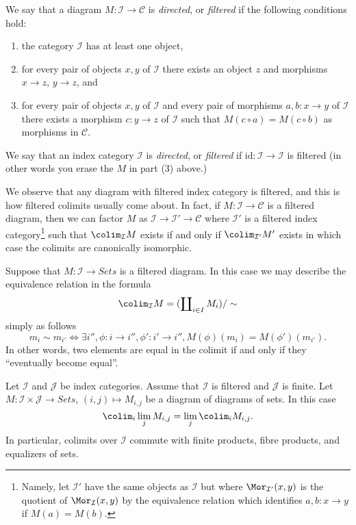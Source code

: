 \begin{definition}
\label{definition-directed}
We say that a diagram $M : \mathcal{I} \to \mathcal{C}$ is {\it directed},
or {\it filtered} if the following conditions hold:
\begin{enumerate}
\item the category $\mathcal{I}$ has at least one object,
\item for every pair of objects $x, y$ of $\mathcal{I}$
there exists an object $z$ and morphisms $x \to z$,
$y \to z$, and
\item for every pair of objects $x, y$ of $\mathcal{I}$
and every pair of morphisms $a, b : x \to y$ of $\mathcal{I}$
there exists a morphism $c : y \to z$ of $\mathcal{I}$
such that $M(c \circ a) = M(c \circ b)$ as morphisms in $\mathcal{C}$.
\end{enumerate}
We say that an index category $\mathcal{I}$ is {\it directed}, or
{\it filtered} if $\text{id} : \mathcal{I} \to \mathcal{I}$ is filtered
(in other words you erase the $M$ in part (3) above.)
\end{definition}

\noindent
We observe that any diagram with filtered index category is filtered,
and this is how filtered colimits usually come about. In fact, if
$M : \mathcal{I} \to \mathcal{C}$ is a filtered diagram, then we
can factor $M$ as $\mathcal{I} \to \mathcal{I}' \to \mathcal{C}$
where $\mathcal{I}'$ is a filtered index category\footnote{Namely, let
$\mathcal{I}'$ have the same objects as $\mathcal{I}$ but
where $\Mor_{\mathcal{I}'}(x, y)$ is the quotient of $\Mor_\mathcal{I}(x, y)$
by the equivalence relation which identifies
$a, b : x \to y$ if $M(a) = M(b)$.}
such that $\colim_\mathcal{I} M$ exists if and only if
$\colim_{\mathcal{I}'} M'$ exists in which case the colimits are
canonically isomorphic.

\medskip\noindent
Suppose that $M : \mathcal{I} \to \textit{Sets}$ is a filtered diagram. In
this case we may describe the equivalence relation in the formula
$$
\colim_\mathcal{I} M
=
(\coprod\nolimits_{i\in I} M_i)/\sim
$$
simply as follows
$$
m_i \sim m_{i'}
\Leftrightarrow
\exists i'', \phi : i \to i'', \phi': i' \to i'',
M(\phi)(m_i) = M(\phi')(m_{i'}).
$$
In other words, two elements are equal in the colimit if and only if
they ``eventually become equal''.

\begin{lemma}
\label{lemma-directed-commutes}
Let $\mathcal{I}$ and $\mathcal{J}$ be index categories.
Assume that $\mathcal{I}$ is filtered and $\mathcal{J}$ is finite.
Let $M : \mathcal{I} \times \mathcal{J} \to \textit{Sets}$,
$(i, j) \mapsto M_{i, j}$ be a diagram of diagrams of sets.
In this case
$$
\colim_i \lim_j M_{i, j}
=
\lim_j \colim_i M_{i, j}.
$$
In particular, colimits over $\mathcal{I}$ commute with finite products,
fibre products, and equalizers of sets.
\end{lemma}

